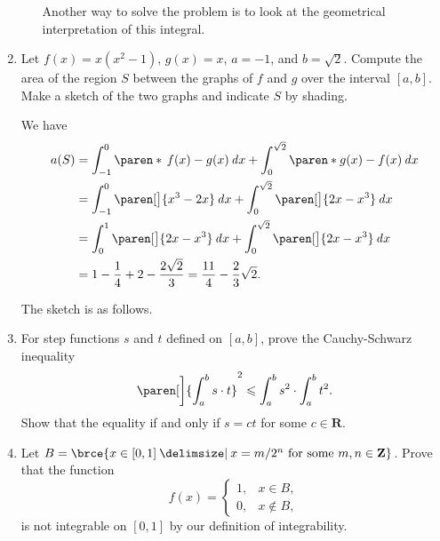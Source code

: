 \documentclass[a4paper]{article}
\begin{document}
\begin{enumerate}
\begin{enumerate}
    Another way to solve the problem is to look at the geometrical
    interpretation of this integral.
  \end{enumerate}

\item Let \(f(x) = x(x^2-1)\), \(g(x) = x\), \(a = -1\), and \(b = \sqrt2\).
  Compute the area of the region \(S\) between the graphs of \(f\) and \(g\)
  over the interval \([a, b]\).  Make a sketch of the two graphs and
  indicate \(S\) by shading.

  We have
  \begin{align*}
    a(S) &= \int_{-1}^0 \paren*{\,f(x) - g(x)} \dx + \int_0^{\sqrt2} \paren*{g(x) - f(x)} \dx \\
         &= \int_{-1}^0 \paren[\big]{x^3 - 2x} \dx + \int_0^{\sqrt2} \paren[\big]{2x-x^3} \dx \\
         &= \int_0^1 \paren[\big]{2x - x^3} \dx + \int_0^{\sqrt2} \paren[\big]{2x-x^3} \dx \\
         &= 1 - \frac14 + 2 - \frac{2\sqrt2}{3} = \frac{11}{4} - \frac23\sqrt2.
  \end{align*}

  The sketch is as follows.

  \begin{figure}[H]
    \centering
  \end{figure}

\item For step functions \(s\) and \(t\) defined on \([a, b]\), prove
  the Cauchy-Schwarz inequality
  \[
    \paren[\bigg]{\int_a^b s \cdot t}^2 \le \int_a^b s^2 \cdot \int_a^b t^2.
  \]
  Show that the equality if and only if \(s = ct\) for some
  \(c \in \mathbf{R}\).

\item[\bonus] Let
  \(B = \brce{x \in [0, 1] \mid x = m/2^n \text{ for some } m, n \in
    \mathbf{Z}}\).  Prove that the function
  \[
    f(x) =
    \begin{cases}
      1, & x \in B, \\
      0, & x \notin B,
    \end{cases}
  \]
  is not integrable on \([0, 1]\) by our definition of integrability.
\end{enumerate}
\end{document}
